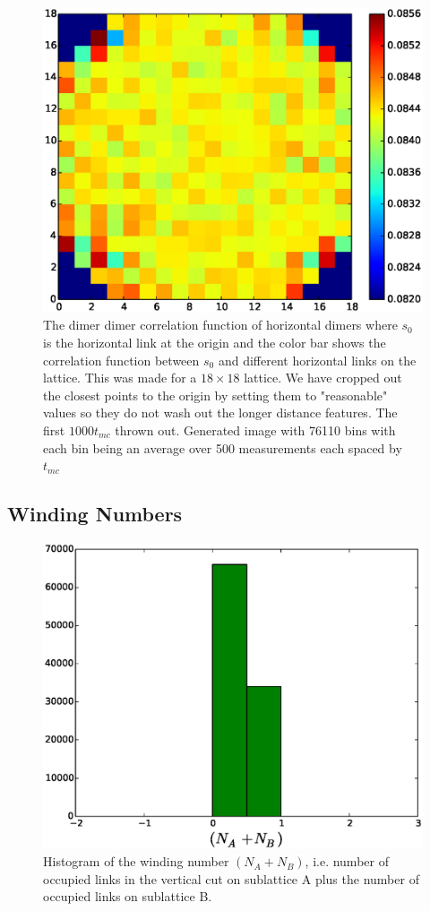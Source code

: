 \documentclass[aps,floatfix,11pt]{revtex4-1}
\begin{document}
\begin{figure}[h]
    \centering
    \includegraphics[width=8.5 cm]{full_lat_dmr_dmr_cor_str_dmr_mdl}
    \caption{The dimer dimer correlation function of horizontal dimers where $s_0$ is the
        horizontal link at the origin and the color bar shows the correlation function between $s_0$
        and different
        horizontal links on the lattice. This was made for a $18\times18$
        lattice. We have cropped out the closest points to the origin by setting them to 
        "reasonable" values so they do not wash out the longer distance features. The first $1000t_{mc}$ thrown out. Generated image with 76110 bins with each bin being
    an average over 500 measurements each spaced by $t_{mc}$ \label{}}
\end{figure}

\clearpage

\subsection{Winding Numbers}

\begin{figure}[h]
    \centering
    \includegraphics[width=8.5 cm]{W_vrt_NApNB_str_dmr_mdl}
    \caption{Histogram of the winding number $(N_A + N_B)$, i.e. number of occupied links in the
    vertical cut on sublattice A plus the number of occupied links on sublattice B.\label{}}
\end{figure}
\end{document}
